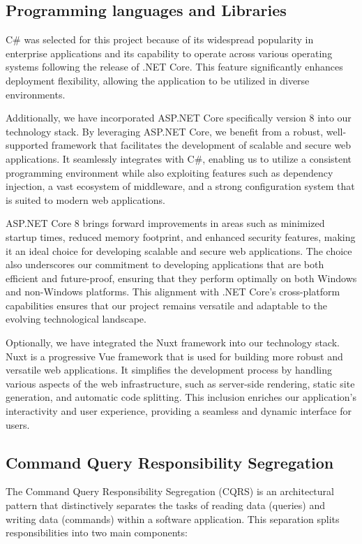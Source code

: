
\subsection{Programming languages and Libraries}

C\# was selected for this project because of its widespread popularity in
enterprise applications and its capability to operate across various operating
systems following the release of .NET Core. This feature significantly enhances
deployment flexibility, allowing the application to be utilized in diverse
environments. 

Additionally, we have incorporated ASP.NET Core specifically version 8 into our
technology stack. By leveraging ASP.NET Core, we benefit from a robust,
well-supported framework that facilitates the development of scalable and secure
web applications. It seamlessly integrates with C\#, enabling us to utilize a
consistent programming environment while also exploiting features such as
dependency injection, a vast ecosystem of middleware, and a strong configuration
system that is suited to modern web applications.

ASP.NET Core 8 brings forward improvements in areas such as minimized startup
times, reduced memory footprint, and enhanced security features, making it an
ideal choice for developing scalable and secure web applications. The choice
also underscores our commitment to developing applications that are both
efficient and future-proof, ensuring that they perform optimally on both Windows
and non-Windows platforms. This alignment with .NET Core’s cross-platform
capabilities ensures that our project remains versatile and adaptable to the
evolving technological landscape.

Optionally, we have integrated the Nuxt framework into our technology stack.
Nuxt is a progressive Vue framework that is used for building more robust and
versatile web applications. It simplifies the development process by handling
various aspects of the web infrastructure, such as server-side rendering, static
site generation, and automatic code splitting. This inclusion enriches our
application's interactivity and user experience, providing a seamless and
dynamic interface for users.

\subsection{Command Query Responsibility Segregation}

The Command Query Responsibility Segregation (CQRS) is an architectural pattern
that distinctively separates the tasks of reading data (queries) and writing
data (commands) within a software application. This separation splits
responsibilities into two main components:

